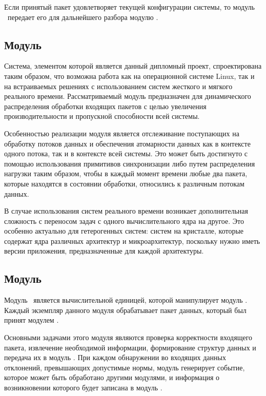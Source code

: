 Если принятый пакет удовлетворяет текущей конфигурации системы, то модуль \moduleRecvPackets\ передает его для дальнейшего разбора модулю \moduleProcessPackets.

\subsection{Модуль \moduleThreads}

Система, элементом которой является данный дипломный проект, спроектирована таким образом, что возможна работа как на операционной системе Linux, так и на встраиваемых решениях с использованием систем жесткого и мягкого реального времени. Рассматриваемый модуль предназначен для динамического распределения обработки входящих пакетов с целью увеличения производительности и пропускной способности всей системы.

Особенностью реализации модуля является отслеживание поступающих на обработку потоков данных и обеспечения атомарности данных как в контексте одного потока, так и в контексте всей системы. Это может быть достигнуто с помощью использования примитивов синхронизации либо путем распределения нагрузки таким образом, чтобы в каждый момент времени любые два пакета, которые находятся в состоянии обработки, относились к различным потокам данных.

В случае использования систем реального времени возникает дополнительная сложность с переносом задач с одного вычислительного ядра на другое. Это особенно актуально для гетерогенных систем: систем на кристалле, которые содержат ядра различных архитектур и микроархитектур, поскольку нужно иметь версии приложения, предназначенные для каждой архитектуры.

\subsection{Модуль \moduleProcessPackets}

Модуль \moduleProcessPackets\ является вычислительной единицей, которой манипулирует модуль \moduleThreads. Каждый экземпляр данного модуля обрабатывает пакет данных, который был принят модулем \moduleRecvPackets.

Основными задачами этого модуля являются проверка корректности входящего пакета, извлечение необходимой информации, формирование структур данных и передача их в модуль \moduleDataStoring. При каждом обнаружении во входящих данных отклонений, превышающих допустимые нормы, модуль генерирует событие, которое может быть обработано другими модулями, и информация о возникновении которого будет записана в модуль \moduleLog.

